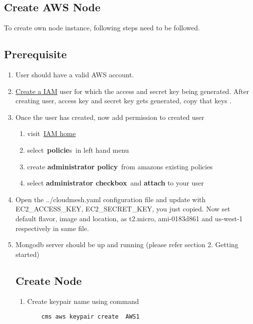 \documentclass[9pt,twocolumn,twoside]{../../styles/osajnl}
\begin{document}
\begin{enumerate}
    
\section{Create AWS Node}
	To create own node instance, following steps need to be followed. 

\subsection{Prerequisite}

\begin{enumerate}
	\item User should have a valid AWS account.
	\item \href{https://console.aws.amazon.com/iam/home?#/users}{Create a IAM}  user for which the access and secret key being generated. After creating user, access key and secret key gets generated, copy that keys \cite{www-attach-policy}.
	\item Once the user has created, now add permission to created user
		\begin{enumerate}
			
			\item visit \href{https://console.aws.amazon.com/iam/home} {IAM home}
			\item select \textbf{policie}s in left hand menu
			\item create \textbf{administrator policy} from amazons existing policies
			\item select \textbf{administrator checkbox} and \textbf{attach} to your user
		\end{enumerate}
	\item Open the ../cloudmesh.yaml configuration file and update with EC2\_ACCESS\_KEY, EC2\_SECRET\_KEY, you just copied. Now set default flavor, image and location, as t2.micro, ami-0183d861 and us-west-1 respectively in same file.
	\item Mongodb server should be up and running (please refer section 2. Getting started)

\subsection{Create Node}

\begin{enumerate}
	\item Create keypair name using command
	
	\begin{verbatim}
	cms aws keypair create  AWS1
	\end{verbatim}
	

\end{enumerate}
\end{enumerate}
\end{enumerate}
\end{document}
